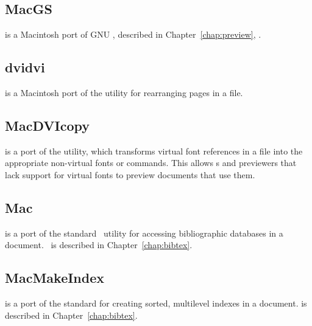 
\subsection{MacGS}

 is a Macintosh port 
of GNU , described in
Chapter~\ref{chap:preview}, {\it{}}.

\subsection{dvidvi}

 is a Macintosh port of the  utility for 
rearranging pages in a  file.  

\subsection{MacDVIcopy}

 is a port of the  utility,
which transforms virtual font references in a 
file into the appropriate non-virtual fonts or commands.  This allows
\dvidriver{}s and previewers that lack support for virtual fonts to
preview documents that use them.

\subsection{Mac\protect\BibTeX}

 is a port of the standard \BibTeX\ utility for 
accessing bibliographic databases in a document.  \BibTeX\ is described
in Chapter~\ref{chap:bibtex}.

\subsection{MacMakeIndex}

 is a port of the standard 
for creating sorted, multilevel indexes in a document.
 is described in Chapter~\ref{chap:bibtex}.

\egroup %
